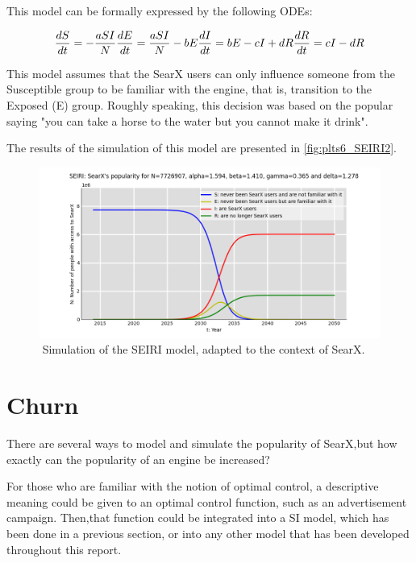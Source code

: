 \documentclass{article}
\begin{document}
This‌ ‌model‌ ‌can‌ ‌be‌ ‌formally‌ ‌expressed‌ ‌by‌ ‌the‌ ‌following‌ ‌ODEs:‌

\begin{equation}
    \begin{subequations}
        \frac{dS}{dt} = - \frac{aSI}{N} 
        \frac{dE}{dt} = \frac{aSI}{N} - bE 
        \frac{dI}{dt} = bE - cI + dR 
        \frac{dR}{dt} = cI - dR
    \end{subequations}
    \label{eq:SEIRIode}
\end{equation}

This‌ ‌model‌ ‌assumes‌ ‌that‌ ‌the‌ ‌SearX‌ ‌users‌ ‌can‌ ‌only‌ ‌influence‌ ‌someone‌ ‌from‌ ‌the‌ ‌Susceptible‌‌ group‌ ‌to‌ ‌be‌ ‌familiar‌ ‌with‌ ‌the‌ ‌engine,‌ ‌that‌ ‌is,‌ ‌transition‌ ‌to‌ ‌the‌ ‌Exposed‌ ‌(E)‌ ‌group.‌ ‌Roughly‌‌ speaking, ‌‌this‌‌ decision‌‌ was‌‌ based‌‌ on‌‌ the‌‌ popular‌‌ saying‌‌ "you‌‌ can‌‌ take‌‌ a‌‌ horse‌‌ to‌‌ the‌‌ water‌‌ but‌‌ you‌ ‌cannot‌ ‌make‌ ‌it‌ ‌drink".‌

The‌ ‌results‌ ‌of‌ ‌the‌ ‌simulation‌ ‌of‌ ‌this‌ ‌model‌ ‌are‌ ‌presented‌ ‌in‌ \autoref{fig:plts6_SEIRI2}.‌

\begin{figure}[h]
    \centering
    \includegraphics[width=0.8\linewidth]{plts6_SEIRI2}
    \caption{‌‌‌ ‌Simulation‌ ‌of‌ ‌the‌ ‌SEIR‌I ‌model,‌ ‌adapted‌ ‌to‌ ‌the‌ ‌context‌ ‌of ‌SearX.‌‌‌‌‌‌‌}
    \label{fig:plts6_SEIRI2}
\end{figure}

\section{Churn}

There ‌‌are‌‌ several‌‌ ways‌‌ to‌‌ model‌‌ and‌‌ simulate‌‌ the‌‌ popularity‌‌ of‌‌ SearX,‌‌but‌‌ how‌‌ exactly‌‌ can‌‌ the‌‌ popularity‌ ‌of‌ ‌an‌ ‌engine‌ ‌be‌ ‌increased?‌

For‌ ‌those‌ ‌who‌ ‌are‌ ‌familiar‌ ‌with‌ ‌the‌ ‌notion‌ ‌of‌ ‌optimal‌ ‌control,‌ ‌a‌ ‌descriptive‌ ‌meaning‌ ‌could‌‌ be‌‌ given‌ ‌to‌ ‌an‌ ‌optimal‌ ‌control‌ ‌function,‌ ‌such‌ ‌as‌ ‌an‌ ‌advertisement‌ ‌campaign.‌ ‌Then,‌‌that‌‌ function‌‌ could‌ ‌be‌ ‌integrated‌ ‌into‌ ‌a‌ ‌SI‌ ‌model,‌ ‌which‌ ‌has‌ ‌been‌ ‌done‌ ‌in‌ ‌a‌ ‌previous‌ ‌section,‌ ‌or‌ ‌into‌ ‌any‌‌ other‌ ‌model‌ ‌that‌ ‌has‌ ‌been‌ ‌developed‌ ‌throughout‌ ‌this‌ ‌report.‌‌
\end{document}
